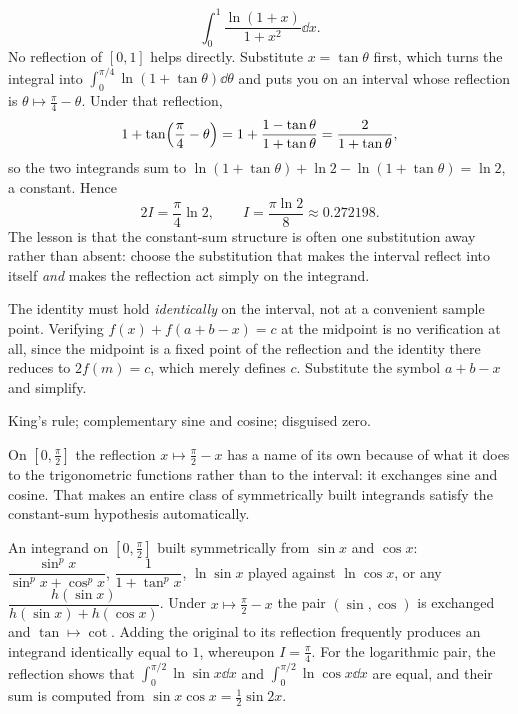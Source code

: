 \begin{worked}
\[\int_0^1\frac{\ln(1+x)}{1+x^{2}}\dd x.\]
No reflection of $[0,1]$ helps directly. Substitute $x=\tan\theta$ first, which turns the integral into $\displaystyle\int_0^{\pi/4}\ln(1+\tan\theta)\dd\theta$ and puts you on an interval whose reflection is $\theta\mapsto\tfrac{\pi}{4}-\theta$. Under that reflection,
\[1+\tan\Bigl(\frac{\pi}{4}-\theta\Bigr)=1+\frac{1-\tan\theta}{1+\tan\theta}=\frac{2}{1+\tan\theta},\]
so the two integrands sum to $\ln(1+\tan\theta)+\ln2-\ln(1+\tan\theta)=\ln2$, a constant. Hence
\[2I=\frac{\pi}{4}\ln2,\qquad I=\frac{\pi\ln2}{8}\approx0.272198.\]
The lesson is that the constant-sum structure is often one substitution away rather than absent: choose the substitution that makes the interval reflect into itself \emph{and} makes the reflection act simply on the integrand.
\end{worked}

\begin{trap}
The identity must hold \emph{identically} on the interval, not at a convenient sample point. Verifying $f(x)+f(a+b-x)=c$ at the midpoint is no verification at all, since the midpoint is a fixed point of the reflection and the identity there reduces to $2f(m)=c$, which merely defines $c$. Substitute the symbol $a+b-x$ and simplify.
\end{trap}

\begin{seealsob}King's rule; complementary sine and cosine; disguised zero.\end{seealsob}

On $[0,\tfrac{\pi}{2}]$ the reflection $x\mapsto\tfrac{\pi}{2}-x$ has a name of its own because of what it does to the trigonometric functions rather than to the interval: it exchanges sine and cosine. That makes an entire class of symmetrically built integrands satisfy the constant-sum hypothesis automatically.

\cue An integrand on $[0,\tfrac{\pi}{2}]$ built symmetrically from $\sin x$ and $\cos x$: $\dfrac{\sin^{p}x}{\sin^{p}x+\cos^{p}x}$, $\dfrac{1}{1+\tan^{p}x}$, $\ln\sin x$ played against $\ln\cos x$, or any $\dfrac{h(\sin x)}{h(\sin x)+h(\cos x)}$.
\method Under $x\mapsto\tfrac{\pi}{2}-x$ the pair $(\sin,\cos)$ is exchanged and $\tan\mapsto\cot$. Adding the original to its reflection frequently produces an integrand identically equal to $1$, whereupon $I=\tfrac{\pi}{4}$. For the logarithmic pair, the reflection shows that $\int_0^{\pi/2}\ln\sin x\dd x$ and $\int_0^{\pi/2}\ln\cos x\dd x$ are equal, and their sum is computed from $\sin x\cos x=\tfrac12\sin2x$.

